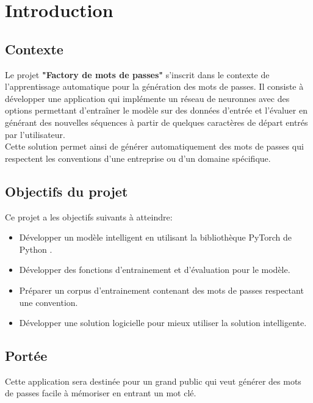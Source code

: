 \section{Introduction}

\subsection{Contexte}
Le projet \textbf{"Factory de mots de passes"} s'inscrit dans le contexte de l'apprentissage automatique pour la génération des mots de passes. Il consiste à développer une application qui implémente un réseau de neuronnes avec des options permettant d'entraîner le modèle sur des données d'entrée et l'évaluer en générant des nouvelles séquences à partir de quelques caractères de départ entrés par l'utilisateur.\\
Cette solution permet ainsi de générer automatiquement des mots de passes qui respectent les conventions d'une entreprise ou d'un domaine spécifique.
\subsection{Objectifs du projet}
Ce projet a les objectifs suivants à atteindre:
\begin{itemize}
    \item Développer un modèle intelligent en utilisant la bibliothèque PyTorch \cite{pytorch} de Python \cite{python}.
    \item Développer des fonctions d'entrainement et d'évaluation pour le modèle.
    \item Préparer un corpus d'entrainement contenant des mots de passes respectant une convention.
    \item Développer une solution logicielle pour mieux utiliser la solution intelligente.
\end{itemize}
\subsection{Portée}
Cette application sera destinée pour un grand public qui veut générer des mots de passes facile à mémoriser en entrant un mot clé.

